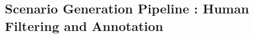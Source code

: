 \documentclass[sigconf,review]{acmart}
\begin{document}
\subsection{Scenario Generation Pipeline : Human Filtering and Annotation}

\end{document}
